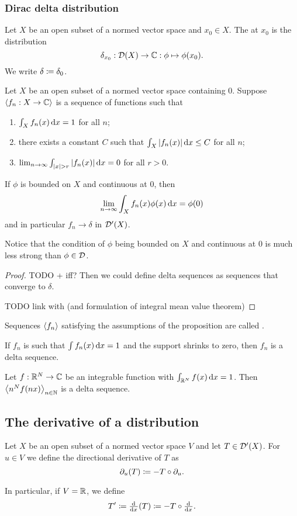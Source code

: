 \subsubsection{Dirac delta distribution}
\begin{definition}
    Let $X$ be an open subset of a normed vector space and $x_0\in X$. The  at $x_0$ is the distribution
    \[ \delta_{x_0}: \operatorname{\mathcal{D}}(X) \to \mathbb{C}: \phi \mapsto \phi(x_0). \]
    We write $\delta \coloneqq \delta_0$.
\end{definition}

\begin{proposition}
Let $X$ be an open subset of a normed vector space containing $0$. Suppose $\left\langle f_n: X\to \mathbb{C} \right\rangle$ is a sequence of functions such that
\begin{enumerate}
\item $\int_X f_n(x)\operatorname{d \!}{x} = 1$ for all $n$;
\item there exists a constant $C$ such that $\int_X |f_n(x)|\operatorname{d \!}{x} \leq C$ for all $n$;
\item $\lim_{n\to \infty} \int_{|x|>r}|f_n(x)|\diff{x} = 0 $ for all $r > 0$.
\end{enumerate}
If $\phi$ is bounded on $X$ and continuous at $0$, then
\[ \lim_{n\to \infty} \int_X f_n(x)\phi(x)\operatorname{d \!}{x} = \phi(0) \]
and in particular $f_n\to \delta$ in $\operatorname{\mathcal{D}^\prime}(X)$.
\end{proposition}
Notice that the condition of $\phi$ being bounded on $X$ and continuous at $0$ is much less strong than $\phi\in\operatorname{\mathcal{D}}$.
\begin{proof}
TODO + iff? Then we could define delta sequences as sequences that converge to $\delta$.

TODO link with (and formulation of integral mean value theorem)
\end{proof}
Sequences $\left\langle f_n \right\rangle$ satisfying the assumptions of the proposition are called .

\begin{lemma}
If $f_n$ is such that $\int f_n(x) \operatorname{d \!}{x} = 1$ and the support shrinks to zero, then $f_n$ is a delta sequence.
\end{lemma}

\begin{lemma}
Let $f: \mathbb{R}^N\to\mathbb{C}$ be an integrable function with $\int_{\mathbb{R}^N}f(x)\operatorname{d \!}{x} = 1$. Then $\left\langle n^Nf(nx) \right\rangle_{n\in \mathbb{N}}$ is a delta sequence.
\end{lemma}

\subsection{The derivative of a distribution}
\begin{definition}
Let $X$ be an open subset of a normed vector space $V$ and let $T\in \operatorname{\mathcal{D}^\prime}(X)$. For $u\in V$ we define the directional derivative of $T$ as
\[ \partial_u(T) \coloneqq - T\circ \partial_u. \]

In particular, if $V = \mathbb{R}$, we define
\[ T' \defeq \od{}{x}(T) \defeq - T\circ \od{}{x}. \]
\end{definition}

